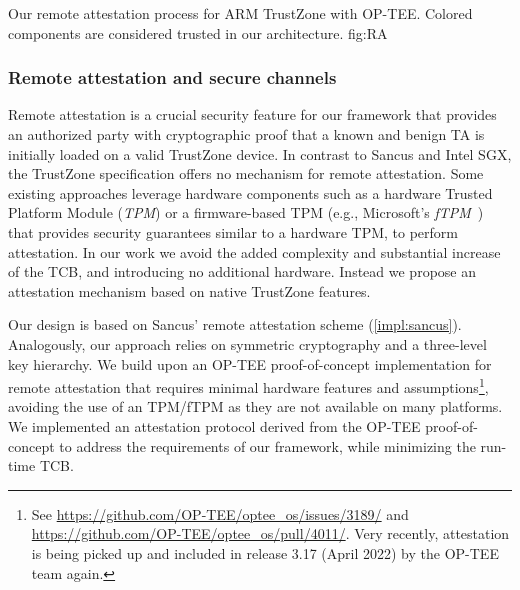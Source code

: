 %
  {}%
  {Our remote attestation process for ARM TrustZone with OP-TEE. Colored
  components are considered trusted in our architecture.}%
  {fig:RA}

\subsubsection{Remote attestation and secure channels}
\label{impl:tz-attestation}

Remote attestation is a crucial security feature for our framework that provides
an authorized party with cryptographic proof that a known and benign TA is
initially loaded on a valid TrustZone device. In contrast to Sancus and Intel
SGX, the TrustZone specification offers no mechanism for remote attestation.
Some existing approaches leverage hardware components such as a hardware Trusted
Platform Module (\emph{TPM}) or a firmware-based TPM (e.g., Microsoft's
\emph{fTPM}~\cite{FTPM}) that provides security guarantees similar to a hardware
TPM, to perform attestation.  In our work we avoid the added complexity and
substantial increase of the TCB, and introducing no additional hardware. Instead
we propose an attestation mechanism based on native TrustZone features.

Our design is based on Sancus' remote attestation scheme (\cref{impl:sancus}).
Analogously, our approach relies on symmetric cryptography and a three-level key
hierarchy. We build upon an OP-TEE proof-of-concept implementation for remote
attestation that requires minimal hardware features and assumptions\footnote{See
\url{https://github.com/OP-TEE/optee\_os/issues/3189/} and
\url{https://github.com/OP-TEE/optee\_os/pull/4011/}. Very recently, attestation
is being picked up and included in release 3.17 (April 2022) by the OP-TEE team
again.}, avoiding the use of an TPM/fTPM as they are not available on many
platforms. We implemented an attestation protocol derived from the OP-TEE
proof-of-concept to address the requirements of our framework, while minimizing
the run-time TCB.

